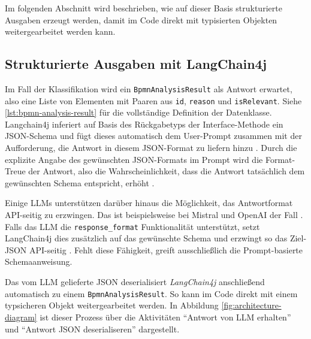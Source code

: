 Im folgenden Abschnitt wird beschrieben, wie auf dieser Basis strukturierte Ausgaben erzeugt werden, damit im Code direkt mit typisierten Objekten weitergearbeitet werden kann.

\subsection*{Strukturierte Ausgaben mit LangChain4j}

Im Fall der Klassifikation wird ein \texttt{BpmnAnalysisResult} als Antwort erwartet, also eine Liste von Elementen mit Paaren aus \texttt{id}, \texttt{reason} und \texttt{isRelevant}. Siehe \ref{lst:bpmn-analysis-result} für die vollständige Definition der Datenklasse. Langchain4j inferiert auf Basis des Rückgabetyps der Interface-Methode ein JSON-Schema und fügt dieses automatisch dem User-Prompt zusammen mit der Aufforderung, die Antwort in diesem JSON-Format zu liefern hinzu \cite{langchain4j-ai-services}. Durch die explizite Angabe des gewünschten JSON-Formats im Prompt wird die Format-Treue der Antwort, also die Wahrscheinlichkeit, dass die Antwort tatsächlich dem gewünschten Schema entspricht, erhöht \cite{liu2023prompting}.

Einige \acp{LLM} unterstützen darüber hinaus die Möglichkeit, das Antwortformat API-seitig zu erzwingen. Das ist beispielsweise bei Mistral und OpenAI der Fall \cite{mistralai_structured_output, openai_structured_output}.
Falls das \ac{LLM} die \texttt{response\_format} Funktionalität unterstützt, setzt LangChain4j dies zusätzlich auf das gewünschte Schema und erzwingt so das Ziel-JSON API-seitig \cite{langchain4j-ai-services}. Fehlt diese Fähigkeit, greift ausschließlich die Prompt-basierte Schemaanweisung.

Das vom \ac{LLM} gelieferte JSON deserialisiert \emph{LangChain4j} anschließend automatisch zu einem \texttt{BpmnAnalysisResult}. So kann im Code direkt mit einem typsicheren Objekt weitergearbeitet werden. In Abbildung \ref{fig:architecture-diagram} ist dieser Prozess über die Aktivitäten \enquote{Antwort von LLM erhalten} und \enquote{Antwort JSON deserialiseren} dargestellt.
